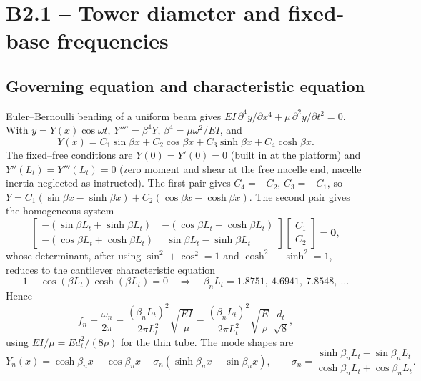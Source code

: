 \documentclass[11pt,a4paper]{article}
\begin{document}
\section{B2.1 -- Tower diameter and fixed-base frequencies}\label{sec:b21}
\subsection*{Governing equation and characteristic equation}
Euler--Bernoulli bending of a uniform beam gives $EI\,\partial^4y/\partial x^4+\mu\,\partial^2y/\partial t^2=0$. With $y=Y(x)\cos\omega t$, $Y''''=\beta^4Y$, $\beta^4=\mu\omega^2/EI$, and
\[
Y(x)=C_1\sin\beta x+C_2\cos\beta x+C_3\sinh\beta x+C_4\cosh\beta x .
\]
The fixed--free conditions are $Y(0)=Y'(0)=0$ (built in at the platform) and $Y''(L_t)=Y'''(L_t)=0$ (zero moment and shear at the free nacelle end, nacelle inertia neglected as instructed). The first pair gives $C_4=-C_2$, $C_3=-C_1$, so
$Y=C_1(\sin\beta x-\sinh\beta x)+C_2(\cos\beta x-\cosh\beta x)$. The second pair gives the homogeneous system
\[
\begin{bmatrix}
-(\sin\beta L_t+\sinh\beta L_t) & -(\cos\beta L_t+\cosh\beta L_t)\\
-(\cos\beta L_t+\cosh\beta L_t) & \ \ \sin\beta L_t-\sinh\beta L_t
\end{bmatrix}\!\begin{bmatrix}C_1\\C_2\end{bmatrix}=\mathbf 0,
\]
whose determinant, after using $\sin^2+\cos^2=1$ and $\cosh^2-\sinh^2=1$, reduces to the cantilever characteristic equation
\begin{equation}
1+\cos(\beta L_t)\cosh(\beta L_t)=0 \quad\Rightarrow\quad \beta_nL_t=1.8751,\ 4.6941,\ 7.8548,\ \ldots
\label{eq:cant}
\end{equation}
Hence
\begin{equation}
f_n=\frac{\omega_n}{2\pi}=\frac{(\beta_nL_t)^2}{2\pi L_t^2}\sqrt{\frac{EI}{\mu}}
=\frac{(\beta_nL_t)^2}{2\pi L_t^2}\sqrt{\frac{E}{\rho}}\;\frac{d_t}{\sqrt 8},
\label{eq:fn}
\end{equation}
using $EI/\mu=E d_t^2/(8\rho)$ for the thin tube. The mode shapes are
\begin{equation}
Y_n(x)=\cosh\beta_nx-\cos\beta_nx-\sigma_n(\sinh\beta_nx-\sin\beta_nx),\qquad
\sigma_n=\frac{\sinh\beta_nL_t-\sin\beta_nL_t}{\cosh\beta_nL_t+\cos\beta_nL_t}.
\label{eq:shape}
\end{equation}
\end{document}
